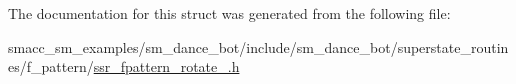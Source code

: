 The documentation for this struct was generated from the following file\+:\begin{DoxyCompactItemize}
\item 
smacc\+\_\+sm\+\_\+examples/sm\+\_\+dance\+\_\+bot/include/sm\+\_\+dance\+\_\+bot/superstate\+\_\+routines/f\+\_\+pattern/\hyperlink{ssr__fpattern__rotate__1_8h}{ssr\+\_\+fpattern\+\_\+rotate\+\_.\+h}\end{DoxyCompactItemize}
